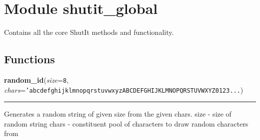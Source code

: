 %
%
%


\section{Module shutit\_global}

    \label{shutit_global}
Contains all the core ShutIt methods and functionality.



  \subsection{Functions}

    \label{shutit_global:random_id}

    \vspace{0.5ex}

\hspace{.8\funcindent}\begin{boxedminipage}{\funcwidth}

    \raggedright \textbf{random\_id}(\textit{size}={\tt 8}, \textit{chars}={\tt \texttt{'}\texttt{abcdefghijklmnopqrstuvwxyzABCDEFGHIJKLMNOPQRSTUVWXYZ0123}\texttt{...}})

    \vspace{-1.5ex}

    \rule{\textwidth}{0.5\fboxrule}
\setlength{\parskip}{2ex}
    Generates a random string of given size from the given chars. size    -
    size of random string chars   - constituent pool of characters to draw 
    random characters from

\setlength{\parskip}{1ex}
    \end{boxedminipage}

    \label{shutit_global:init}

